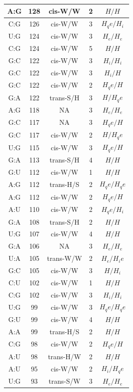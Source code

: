 \begin{center}
\begin{longtable}{c|c|c|c|c}
A:G & 128 & cis-W/W & 2 & $H/H$ \\  \hline
C:G & 126 & cis-W/W & 3 & $H_qe/H_i$ \\  \hline
U:G & 124 & cis-W/W & 3 & $H_e/H_e$ \\  \hline
C:G & 124 & cis-W/W & 5 & $H/H$ \\  \hline
G:C & 122 & cis-W/W & 3 & $H_i/H_i$ \\  \hline
G:C & 122 & cis-W/W & 3 & $H_i/H$ \\  \hline
G:C & 122 & cis-W/W & 2 & $H_qe/H$ \\  \hline
G:A & 122 & trans-S/H & 3 & $H/H_qe$ \\  \hline
A:G & 118 & NA & 3 & $H_e/H_e$ \\  \hline
G:C & 117 & NA & 3 & $H_qe/H$ \\  \hline
G:C & 117 & cis-W/W & 2 & $H/H_qe$ \\  \hline
U:G & 115 & cis-W/W & 3 & $H_qe/H$ \\  \hline
G:A & 113 & trans-S/H & 4 & $H/H$ \\  \hline
G:U & 112 & cis-W/W & 1 & $H/H$ \\  \hline
A:G & 112 & trans-H/S & 2 & $H_qe/H_qe$ \\  \hline
A:G & 112 & cis-W/W & 2 & $H_qe/H$ \\  \hline
A:U & 110 & cis-W/W & 2 & $H_qe/H_i$ \\  \hline
G:A & 108 & trans-S/H & 2 & $H/H$ \\  \hline
U:G & 107 & cis-W/W & 4 & $H/H$ \\  \hline
G:A & 106 & NA & 3 & $H_e/H_e$ \\  \hline
U:A & 105 & trans-W/W & 2 & $H_e/H_ie$ \\  \hline
G:C & 105 & cis-W/W & 3 & $H/H_i$ \\  \hline
C:U & 102 & cis-W/W & 1 & $H/H$ \\  \hline
C:G & 102 & cis-W/W & 3 & $H_i/H_i$ \\  \hline
U:G & 99 & cis-W/W & 3 & $H_qe/H_qe$ \\  \hline
G:U & 99 & cis-W/W & 4 & $H/H$ \\  \hline
A:A & 99 & trans-H/S & 2 & $H/H$ \\  \hline
C:G & 98 & cis-W/W & 2 & $H_qe/H$ \\  \hline
A:U & 98 & trans-H/W & 2 & $H/H$ \\  \hline
A:U & 95 & cis-W/W & 2 & $H_i/H_qe$ \\  \hline
U:G & 93 & trans-S/W & 3 & $H_e/H_e$ \\  \hline

\end{longtable}
\end{center}
